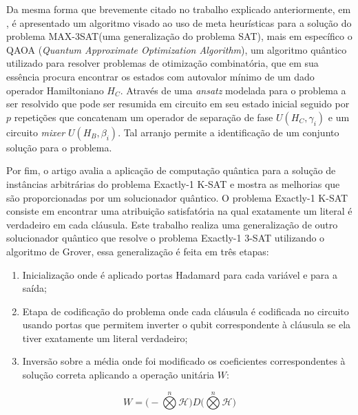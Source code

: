 \documentclass[12pt]{article}
\begin{document}

Da mesma forma que brevemente citado no trabalho explicado anteriormente, em \cite{mandl:24}, é apresentado um algoritmo visado ao uso de meta heurísticas para a solução do problema MAX-3SAT(uma generalização do problema SAT), mais em específico o QAOA (\textit{Quantum Approximate Optimization Algorithm}), um algoritmo quântico utilizado para resolver problemas de otimização combinatória, que em sua essência procura encontrar os estados com autovalor mínimo de um dado operador Hamiltoniano $H_C$. Através de uma \textit{ansatz} modelada para o problema a ser resolvido que pode ser resumida em circuito em seu estado inicial seguido por $p$ repetições que concatenam um operador de separação de fase $U(H_C,\gamma_i)$ e um circuito \textit{mixer} $U(H_B, \beta_i)$. Tal arranjo permite a identificação de um conjunto solução para o problema.


Por fim, o artigo \cite{piro:20} avalia a aplicação de computação quântica para a solução de instâncias arbitrárias do problema Exactly-1 K-SAT e mostra as melhorias que são proporcionadas por um solucionador quântico. O problema Exactly-1 K-SAT consiste em encontrar uma atribuição satisfatória na qual exatamente um literal é verdadeiro em cada cláusula. Este trabalho realiza uma generalização de outro solucionador quântico que resolve o problema Exactly-1 3-SAT utilizando o algoritmo de Grover, essa generalização é feita em três etapas:
\begin{enumerate}
    \item Inicialização onde é aplicado portas Hadamard para cada variável e para a saída;
    \item Etapa de codificação do problema onde cada cláusula é codificada no circuito usando portas que permitem inverter o qubit correspondente à cláusula se ela tiver exatamente um literal verdadeiro;
    \item Inversão sobre a média onde foi modificado os coeficientes correspondentes à solução correta aplicando a operação unitária \(W\):
\end{enumerate} 
\[
W = \big( - \overset{n}{\bigotimes} \mathcal{H} \big) D \big( \overset{n}{\bigotimes} \mathcal{H} \big)
\]





\end{document}
